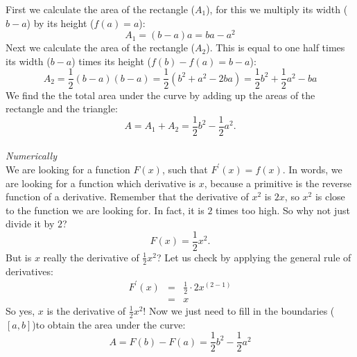 \documentclass[a4paper]{report}
\begin{document}
\begin{mdframed}[backgroundcolor=exampcol]
First we calculate the area of the rectangle ($A_1$), for this we multiply its width ($b-a$) by its height ($f(a) = a$):
\begin{equation*}
A_1 = (b-a)a = ba - a^2
\end{equation*}
Next we calculate the area of the rectangle ($A_2$). This is equal to one half times its width ($b-a$) times its height ($f(b)-f(a)=b-a$):
\begin{equation*}
A_2 = \frac{1}{2} (b-a)(b-a) = \frac{1}{2} \left(b^2 + a^2 - 2ba \right) = \frac{1}{2} b^2 + \frac{1}{2} a^2 - ba 
\end{equation*}
We find the the total area under the curve by adding up the areas of the rectangle and the triangle:
\begin{equation*}
A = A_1 + A_2 = \frac{1}{2} b^2 - \frac{1}{2} a^2.
\end{equation*}\\[0.5ex]
\noindent\textit{Numerically}\\
We are looking for a function $F(x)$, such that $F^\prime(x) = f(x)$. In words, we are looking for a function which derivative is $x$, because a primitive is the reverse function of a derivative. Remember that the derivative of $x^2$ is $2x$, so $x^2$ is close to the function we are looking for. In fact, it is $2$ times too high. So why not just divide it by $2$?
\begin{equation*}
F(x) = \frac{1}{2} x^2.
\end{equation*}
But is $x$ really the derivative of $\frac{1}{2} x^2$? Let us check by applying the general rule of derivatives: 
\begin{eqnarray*}
F^\prime(x) &=& \frac{1}{2} \cdot 2 x^{(2-1)}\\
&=&x
\end{eqnarray*}
So yes,  $x$ is the derivative of $\frac{1}{2} x^2$!
Now we just need to fill in the boundaries ($\left[a,b\right]$)to obtain the area under the curve:
\begin{equation*}
A = F(b) - F(a) = \frac{1}{2} b^2 - \frac{1}{2} a^2
\end{equation*}
\end{mdframed}
\end{document}

